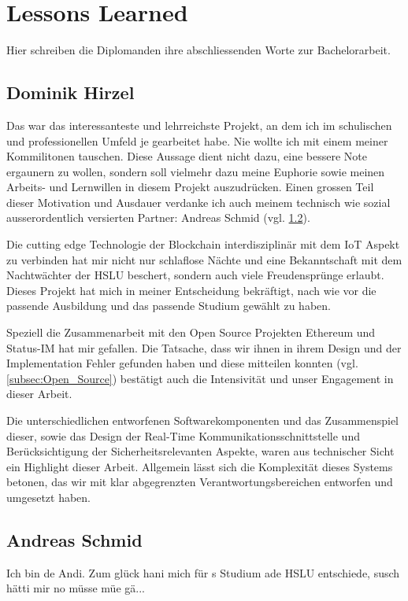 \section{Lessons Learned}
\label{sec:Lessons_Learned}
Hier schreiben die Diplomanden ihre abschliessenden Worte zur Bachelorarbeit.

\subsection{Dominik Hirzel}
Das war das interessanteste und lehrreichste Projekt, an dem ich im schulischen und professionellen Umfeld je gearbeitet habe. Nie wollte ich mit einem meiner Kommilitonen tauschen. Diese Aussage dient nicht dazu, eine bessere Note ergaunern zu wollen, sondern soll vielmehr dazu meine Euphorie sowie meinen Arbeits- und Lernwillen in diesem Projekt auszudrücken. Einen grossen Teil dieser Motivation und Ausdauer verdanke ich auch meinem technisch wie sozial ausserordentlich versierten Partner: Andreas Schmid (vgl. \ref{andi}).

Die cutting edge Technologie der Blockchain interdisziplinär mit dem IoT Aspekt zu verbinden hat mir nicht nur schlaflose Nächte und eine Bekanntschaft mit dem Nachtwächter der HSLU beschert, sondern auch viele Freudensprünge erlaubt. Dieses Projekt hat mich in meiner Entscheidung bekräftigt, nach wie vor die passende Ausbildung und das passende Studium gewählt zu haben.

Speziell die Zusammenarbeit mit den Open Source Projekten Ethereum und Status-IM hat mir gefallen. Die Tatsache, dass wir ihnen in ihrem Design und der Implementation Fehler gefunden haben und diese mitteilen konnten (vgl. \ref{subsec:Open_Source}) bestätigt auch die Intensivität und unser Engagement in dieser Arbeit.

Die unterschiedlichen entworfenen Softwarekomponenten und das Zusammenspiel dieser, sowie das Design der Real-Time Kommunikationsschnittstelle und Berücksichtigung der Sicherheitsrelevanten Aspekte, waren aus technischer Sicht ein Highlight dieser Arbeit. Allgemein lässt sich die Komplexität dieses Systems betonen, das wir mit klar abgegrenzten Verantwortungsbereichen entworfen und umgesetzt haben.

\subsection{Andreas Schmid}
\label{andi}
Ich bin de Andi. Zum glück hani mich für s Studium ade HSLU entschiede, susch hätti mir no müsse müe gä...
